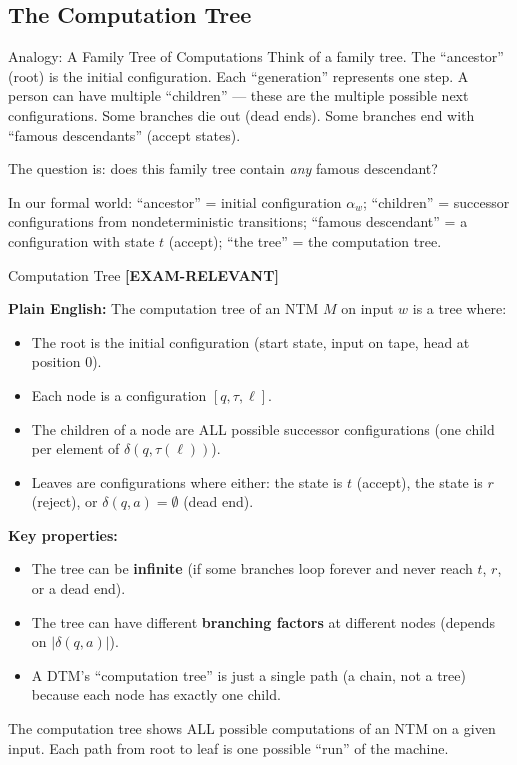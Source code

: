 \documentclass[11pt,a4paper]{article}
\newcommand{\kemark}{\textcolor{red!70!black}{\textbf{[EXAM-RELEVANT]}}}
\newcommand{\kt}[1]{\par\vspace{0.3em}\colorbox{yellow!60}{\parbox{\dimexpr\linewidth-2\fboxsep}{#1}}\vspace{0.3em}}
\begin{document}
\subsection{The Computation Tree}

\begin{notebox}{Analogy: A Family Tree of Computations}
Think of a family tree. The ``ancestor'' (root) is the initial configuration. Each ``generation'' represents one step. A person can have multiple ``children'' --- these are the multiple possible next configurations. Some branches die out (dead ends). Some branches end with ``famous descendants'' (accept states).

The question is: does this family tree contain \textit{any} famous descendant?

In our formal world: ``ancestor'' = initial configuration $\alpha_w$; ``children'' = successor configurations from nondeterministic transitions; ``famous descendant'' = a configuration with state $t$ (accept); ``the tree'' = the computation tree.
\end{notebox}

\begin{definitionbox}{Computation Tree \kemark}

\textbf{Plain English:}
The computation tree of an NTM $M$ on input $w$ is a tree where:
\begin{itemize}[nosep]
\item The root is the initial configuration (start state, input on tape, head at position 0).
\item Each node is a configuration $[q, \tau, \ell]$.
\item The children of a node are ALL possible successor configurations (one child per element of $\delta(q, \tau(\ell))$).
\item Leaves are configurations where either: the state is $t$ (accept), the state is $r$ (reject), or $\delta(q, a) = \emptyset$ (dead end).
\end{itemize}

\textbf{Key properties:}
\begin{itemize}[nosep]
\item The tree can be \textbf{infinite} (if some branches loop forever and never reach $t$, $r$, or a dead end).
\item The tree can have different \textbf{branching factors} at different nodes (depends on $|\delta(q, a)|$).
\item A DTM's ``computation tree'' is just a single path (a chain, not a tree) because each node has exactly one child.
\end{itemize}

\kt{The computation tree shows ALL possible computations of an NTM on a given input. Each path from root to leaf is one possible ``run'' of the machine.}
\end{definitionbox}
\end{document}
